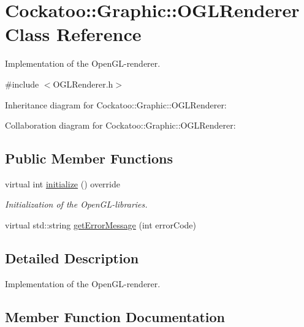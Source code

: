 \hypertarget{classCockatoo_1_1Graphic_1_1OGLRenderer}{}\section{Cockatoo\+:\+:Graphic\+:\+:O\+G\+L\+Renderer Class Reference}
\label{classCockatoo_1_1Graphic_1_1OGLRenderer}


Implementation of the Open\+G\+L-\/renderer.  




{\ttfamily \#include $<$O\+G\+L\+Renderer.\+h$>$}



Inheritance diagram for Cockatoo\+:\+:Graphic\+:\+:O\+G\+L\+Renderer\+:


Collaboration diagram for Cockatoo\+:\+:Graphic\+:\+:O\+G\+L\+Renderer\+:
\subsection*{Public Member Functions}
\begin{DoxyCompactItemize}
\item 
virtual int \hyperlink{classCockatoo_1_1Graphic_1_1OGLRenderer_a180a5fe41fa5024a70e7f55492801aad}{initialize} () override
\begin{DoxyCompactList}\small\item\em Initialization of the Open\+G\+L-\/libraries. \end{DoxyCompactList}\item 
virtual std\+::string \hyperlink{classCockatoo_1_1Graphic_1_1OGLRenderer_ac86dbad008fdc042b36fbdb5ed5cede2}{get\+Error\+Message} (int error\+Code)
\end{DoxyCompactItemize}


\subsection{Detailed Description}
Implementation of the Open\+G\+L-\/renderer. 



\subsection{Member Function Documentation}
